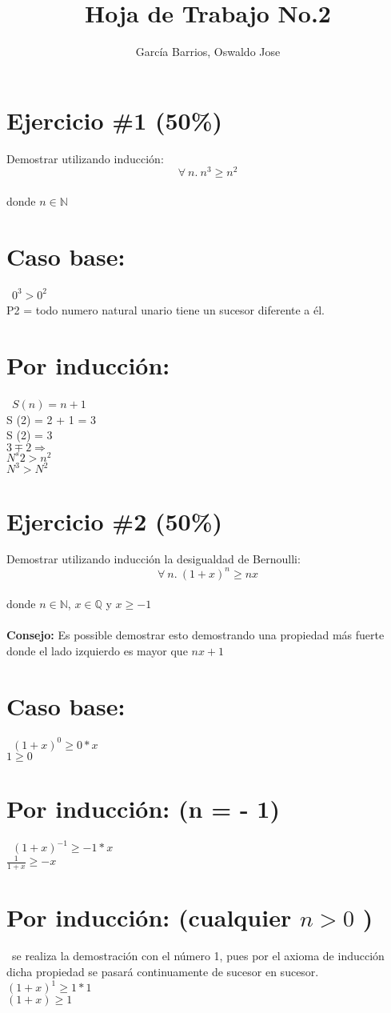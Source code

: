 \documentclass[10pt,a4paper]{article}
\begin{document}
\title{Hoja de Trabajo No.2}
\author{García Barrios, Oswaldo Jose}
\maketitle
\section*{Ejercicio \#1 (50\%)}
Demostrar utilizando inducci\'on:
\[
        \forall\ n.\ n^3\geq n^2
\]
\\donde $n\in\mathbb{N}$
\section*{Caso base:}
\ $0^3 > 0^2$
\\ P2 = todo numero natural unario tiene un sucesor diferente a él. 
\section*{Por inducción:}  
\ $S(n) = n + 1$
\\S (2) = 2 + 1 = 3 
\\S (2) = 3
\\ $ 3\mp 2  \Rightarrow$
\\ $N^s2 > n^2$
\\ $N^3 > N^2$
\section*{Ejercicio \#2 (50\%)}
Demostrar utilizando inducci\'on la desigualdad de Bernoulli:
\[
        \forall\ n.\ (1+x)^n\geq nx
\]
\\donde $n\in \mathbb{N}$, $x\in \mathbb{Q}$ y $x\geq -1$
\\
\\{\bf Consejo: }Es possible demostrar esto demostrando una propiedad m\'as fuerte
donde el lado izquierdo es mayor que $nx + 1$
\section*{Caso base:}
\ $(1 + x)^0 \geq 0*x$
\\ $ 1 \geq 0$
\section*{Por inducción: (n = - 1) }  
\ $(1+x)^{-1} \geq -1 * x$
\\ $\frac{1}{1+x} \geq -x$
\section*{Por inducción: (cualquier $n > 0$  ) }  
\ se realiza la demostración con el número 1, pues por el axioma de inducción dicha propiedad se pasará continuamente de sucesor en sucesor.
\\ $(1 + x)^1 \geq 1 * 1$
\\ $ (1 + x) \geq 1$
\end{document}
